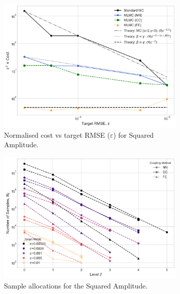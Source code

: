 \begin{figure}[htbp]
    \centering
    \begin{subfigure}{0.45\textwidth}
        \centering
        \includegraphics[width=\linewidth]{graphics/she_sq_amp_costs.png}
        \caption{Normalised cost vs target RMSE ($\varepsilon$) for Squared Amplitude.}
        \label{fig:she_sq_amp_performance}
    \end{subfigure}
    \hfill
    \begin{subfigure}{0.45\textwidth}
        \centering
        \includegraphics[width=\linewidth]{graphics/she_sq_amps_nums.png}
        \caption{Sample allocations for the Squared Amplitude.}
        \label{fig:she_sq_amp_levels_num}
    \end{subfigure}
    \begin{subfigure}{0.45\textwidth}

\end{subfigure}
\end{figure}
